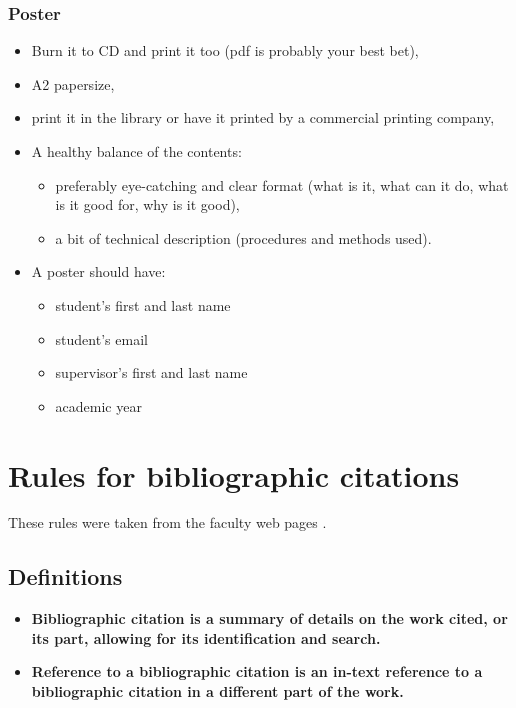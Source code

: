 \subsection*{Poster}
\begin{itemize}
  \item{Burn it to CD and print it too (pdf is probably your best bet),}
  \item{A2 papersize,}
  \item{print it in the library or have it printed by a commercial printing company,}
  \item{A healthy balance of the contents:
  \begin{itemize}
    \item{preferably eye-catching and clear format (what is it, what can it do, what is it good for, why is it good),}
    \item{a bit of technical description (procedures and methods used).}
  \end{itemize}}
  \item{A poster should have:}
  \begin{itemize}
  	\item{student's first and last name}
    \item{student's email}
    \item{supervisor's first and last name}
    \item{academic year}
  \end{itemize}
\end{itemize}

\chapter{Rules for bibliographic citations}
\label{citace}

These rules were taken from the faculty web pages \cite{citace}.

\section{Definitions}

\begin{itemize}
  \item{\bf Bibliographic citation \rm is a summary of details on the work cited, or its part, allowing for its identification and search.}
  \item{\bf Reference to a bibliographic citation \rm is an in-text reference to a bibliographic citation in a different part of the work.}
\end{itemize}

